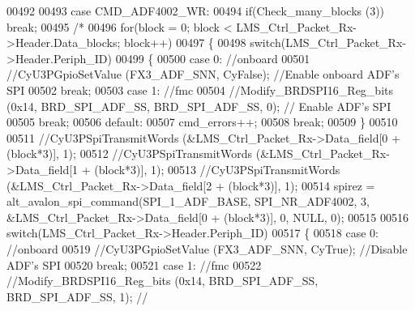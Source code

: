 \begin{DoxyCode}
00492 
00493                 \textcolor{keywordflow}{case} CMD_ADF4002_WR:
00494                     \textcolor{keywordflow}{if}(Check_many_blocks (3)) \textcolor{keywordflow}{break};
00495 \textcolor{comment}{/*}
00496 \textcolor{comment}{                    for(block = 0; block < LMS\_Ctrl\_Packet\_Rx->Header.Data\_blocks; block++)}
00497 \textcolor{comment}{                    \{}
00498 \textcolor{comment}{                        switch(LMS\_Ctrl\_Packet\_Rx->Header.Periph\_ID)}
00499 \textcolor{comment}{                        \{}
00500 \textcolor{comment}{                            case 0: //onboard}
00501 \textcolor{comment}{                                //CyU3PGpioSetValue (FX3\_ADF\_SNN, CyFalse); //Enable onboard ADF's SPI}
00502 \textcolor{comment}{                                break;}
00503 \textcolor{comment}{                            case 1: //fmc}
00504 \textcolor{comment}{                                //Modify\_BRDSPI16\_Reg\_bits (0x14, BRD\_SPI\_ADF\_SS, BRD\_SPI\_ADF\_SS, 0); //
      Enable ADF's SPI}
00505 \textcolor{comment}{                                break;}
00506 \textcolor{comment}{                            default:}
00507 \textcolor{comment}{                                cmd\_errors++;}
00508 \textcolor{comment}{                                break;}
00509 \textcolor{comment}{                        \}}
00510 \textcolor{comment}{}
00511 \textcolor{comment}{                        //CyU3PSpiTransmitWords (&LMS\_Ctrl\_Packet\_Rx->Data\_field[0 + (block*3)], 1);}
00512 \textcolor{comment}{                        //CyU3PSpiTransmitWords (&LMS\_Ctrl\_Packet\_Rx->Data\_field[1 + (block*3)], 1);}
00513 \textcolor{comment}{                        //CyU3PSpiTransmitWords (&LMS\_Ctrl\_Packet\_Rx->Data\_field[2 + (block*3)], 1);}
00514 \textcolor{comment}{                        spirez = alt\_avalon\_spi\_command(SPI\_1\_ADF\_BASE, SPI\_NR\_ADF4002, 3,
       &LMS\_Ctrl\_Packet\_Rx->Data\_field[0 + (block*3)], 0, NULL, 0);}
00515 \textcolor{comment}{}
00516 \textcolor{comment}{                        switch(LMS\_Ctrl\_Packet\_Rx->Header.Periph\_ID)}
00517 \textcolor{comment}{                        \{}
00518 \textcolor{comment}{                            case 0: //onboard}
00519 \textcolor{comment}{                                //CyU3PGpioSetValue (FX3\_ADF\_SNN, CyTrue); //Disable ADF's SPI}
00520 \textcolor{comment}{                            break;}
00521 \textcolor{comment}{                            case 1: //fmc}
00522 \textcolor{comment}{                                //Modify\_BRDSPI16\_Reg\_bits (0x14, BRD\_SPI\_ADF\_SS, BRD\_SPI\_ADF\_SS, 1); //
}
\end{DoxyCode}

